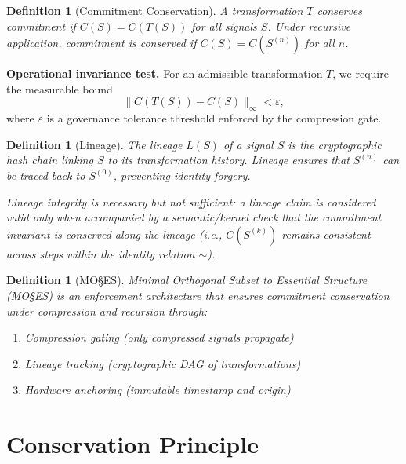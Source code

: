 \documentclass[11pt,a4paper]{article}
\newtheorem{definition}[theorem]{Definition}
\begin{document}
\begin{definition}[Commitment Conservation]
A transformation $T$ conserves commitment if $C(S) = C(T(S))$ for all signals $S$. Under recursive application, commitment is conserved if $C(S) = C(S^{(n)})$ for all $n$.
\end{definition}

\noindent\textbf{Operational invariance test.} For an admissible transformation $T$, we require the measurable bound
\begin{equation}
\| C(T(S)) - C(S) \|_\infty < \varepsilon,
\end{equation}
where $\varepsilon$ is a governance tolerance threshold enforced by the compression gate.

\begin{definition}[Lineage]
The lineage $L(S)$ of a signal $S$ is the cryptographic hash chain linking $S$ to its transformation history. Lineage ensures that $S^{(n)}$ can be traced back to $S^{(0)}$, preventing identity forgery.

Lineage integrity is necessary but not sufficient: a lineage claim is considered valid only when accompanied by a semantic/kernel check that the commitment invariant is conserved along the lineage (i.e., $C(S^{(k)})$ remains consistent across steps within the identity relation $\sim$).
\end{definition}

\begin{definition}[MO\S{}ES\texttrademark{}]
Minimal Orthogonal Subset to Essential Structure (MO\S{}ES\texttrademark{}) is an enforcement architecture that ensures commitment conservation under compression and recursion through:
\begin{enumerate}
    \item Compression gating (only compressed signals propagate)
    \item Lineage tracking (cryptographic DAG of transformations)
    \item Hardware anchoring (immutable timestamp and origin)
\end{enumerate}
\end{definition}

\section{Conservation Principle}
\label{sec:conservation}
\end{document}
